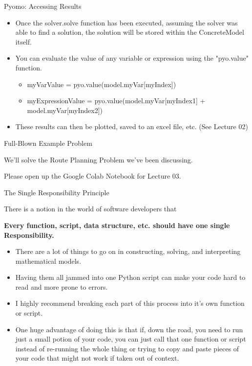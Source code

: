 \documentclass[10pt, aspectratio=169]{beamer}
\begin{document}
\begin{frame}{Pyomo: Accessing Results}
    \begin{itemize}
        \item Once the solver.solve function has been executed, assuming the solver was able to find a solution, the solution will be stored within the ConcreteModel itself.
        \item You can evaluate the value of any variable or expression using the "pyo.value" function.
        \begin{itemize}
            \item myVarValue = pyo.value(model.myVar[myIndex])
            \item myExpressionValue = pyo.value(model.myVar[myIndex1] + model.myVar[myIndex2])
        \end{itemize}
        \item These results can then be plotted, saved to an excel file, etc. (See Lecture 02)
    \end{itemize}
\end{frame}

\begin{frame}{Full-Blown Example Problem}
    \begin{center}
        We'll solve the Route Planning Problem we've been discussing.

        \vspace{1 cm}

        Please open up the Google Colab Notebook for Lecture 03.
    \end{center}
    
\end{frame}

\begin{frame}{The Single Responsibility Principle}
    \begin{center}
        There is a notion in the world of software developers that

        \textbf{Every function, script, data structure, etc. should have one single Responsibility.}
    \end{center}
    \begin{itemize}
        \item There are a lot of things to go on in constructing, solving, and interpreting mathematical models.
        \item Having them all jammed into one Python script can make your code hard to read and more prone to errors.
        \item I highly recommend breaking each part of this process into it's own function or script.
        \item One huge advantage of doing this is that if, down the road, you need to run just a small potion of your code, you can just call that one function or script instead of re-running the whole thing or trying to copy and paste pieces of your code that might not work if taken out of context.
    \end{itemize}
\end{frame}
\end{document}
